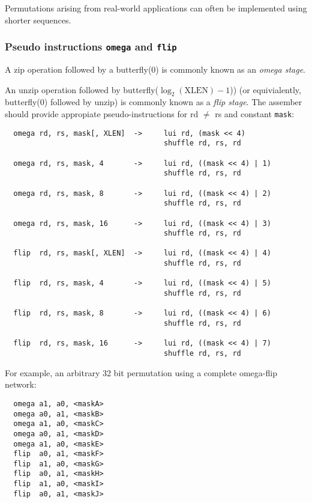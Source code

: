 Permutations arising from real-world applications can often be implemented using
shorter sequences.

\subsubsection{Pseudo instructions {\tt omega} and {\tt flip}}

A zip operation followed by a butterfly(0) is commonly known as an {\it omega stage}.

An unzip operation followed by butterfly($\log_2(\textrm{XLEN})-1$)) (or
equivialently, butterfly(0) followed by unzip) is commonly known as a {\it flip
stage}. The assember should provide appropiate pseudo-instructions for rd
$\neq$ rs and constant {\tt mask}:

\begin{verbatim}
  omega rd, rs, mask[, XLEN]  ->     lui rd, (mask << 4)
                                     shuffle rd, rs, rd

  omega rd, rs, mask, 4       ->     lui rd, ((mask << 4) | 1)
                                     shuffle rd, rs, rd

  omega rd, rs, mask, 8       ->     lui rd, ((mask << 4) | 2)
                                     shuffle rd, rs, rd

  omega rd, rs, mask, 16      ->     lui rd, ((mask << 4) | 3)
                                     shuffle rd, rs, rd

  flip  rd, rs, mask[, XLEN]  ->     lui rd, ((mask << 4) | 4)
                                     shuffle rd, rs, rd

  flip  rd, rs, mask, 4       ->     lui rd, ((mask << 4) | 5)
                                     shuffle rd, rs, rd

  flip  rd, rs, mask, 8       ->     lui rd, ((mask << 4) | 6)
                                     shuffle rd, rs, rd

  flip  rd, rs, mask, 16      ->     lui rd, ((mask << 4) | 7)
                                     shuffle rd, rs, rd
\end{verbatim}

For example, an arbitrary 32 bit permutation using a complete omega-flip network:

\begin{verbatim}
  omega a1, a0, <maskA>
  omega a0, a1, <maskB>
  omega a1, a0, <maskC>
  omega a0, a1, <maskD>
  omega a1, a0, <maskE>
  flip  a0, a1, <maskF>
  flip  a1, a0, <maskG>
  flip  a0, a1, <maskH>
  flip  a1, a0, <maskI>
  flip  a0, a1, <maskJ>
\end{verbatim}

